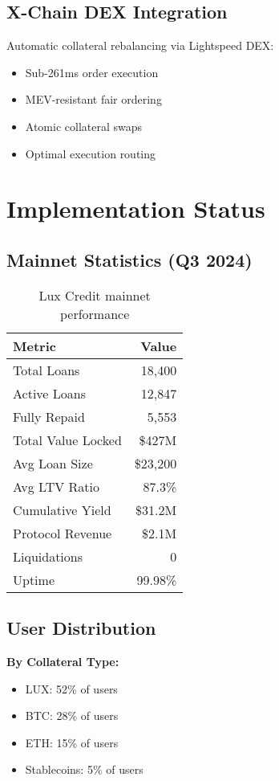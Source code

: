 \documentclass[11pt,a4paper]{article}
\begin{document}
\subsection{X-Chain DEX Integration}

Automatic collateral rebalancing via Lightspeed DEX:

\begin{itemize}
\item Sub-261ms order execution
\item MEV-resistant fair ordering
\item Atomic collateral swaps
\item Optimal execution routing
\end{itemize}

\section{Implementation Status}

\subsection{Mainnet Statistics (Q3 2024)}

\begin{table}[h]
\centering
\begin{tabular}{@{}lr@{}}
\toprule
\textbf{Metric} & \textbf{Value} \\ \midrule
Total Loans & 18,400 \\
Active Loans & 12,847 \\
Fully Repaid & 5,553 \\
Total Value Locked & \$427M \\
Avg Loan Size & \$23,200 \\
Avg LTV Ratio & 87.3\% \\
Cumulative Yield & \$31.2M \\
Protocol Revenue & \$2.1M \\
Liquidations & 0 \\
Uptime & 99.98\% \\ \bottomrule
\end{tabular}
\caption{Lux Credit mainnet performance}
\end{table}

\subsection{User Distribution}

\textbf{By Collateral Type:}
\begin{itemize}
\item LUX: 52\% of users
\item BTC: 28\% of users
\item ETH: 15\% of users
\item Stablecoins: 5\% of users
\end{itemize}
\end{document}
